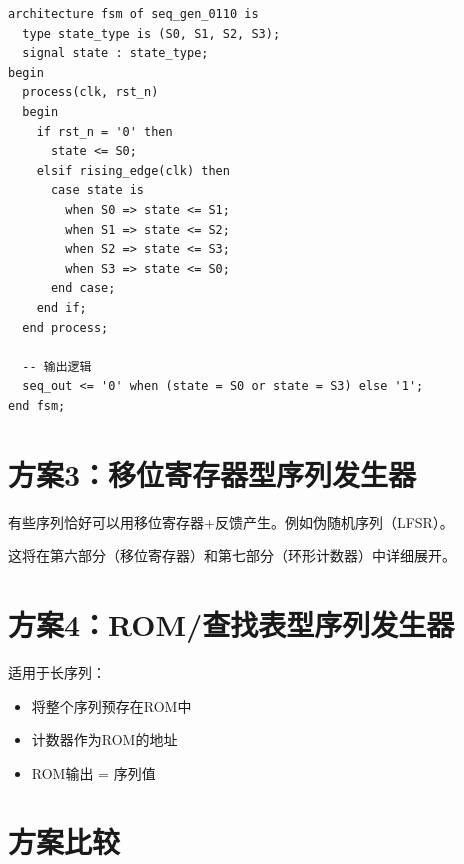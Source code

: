 \begin{center}
\end{center}

\begin{lstlisting}[caption={序列0110发生器（状态机版本）}]
architecture fsm of seq_gen_0110 is
  type state_type is (S0, S1, S2, S3);
  signal state : state_type;
begin
  process(clk, rst_n)
  begin
    if rst_n = '0' then
      state <= S0;
    elsif rising_edge(clk) then
      case state is
        when S0 => state <= S1;
        when S1 => state <= S2;
        when S2 => state <= S3;
        when S3 => state <= S0;
      end case;
    end if;
  end process;

  -- 输出逻辑
  seq_out <= '0' when (state = S0 or state = S3) else '1';
end fsm;
\end{lstlisting}

\section{方案3：移位寄存器型序列发生器}

有些序列恰好可以用移位寄存器+反馈产生。例如伪随机序列（LFSR）。

这将在第六部分（移位寄存器）和第七部分（环形计数器）中详细展开。

\section{方案4：ROM/查找表型序列发生器}

适用于长序列：
\begin{itemize}
  \item 将整个序列预存在ROM中
  \item 计数器作为ROM的地址
  \item ROM输出 = 序列值
\end{itemize}

\section{方案比较}

